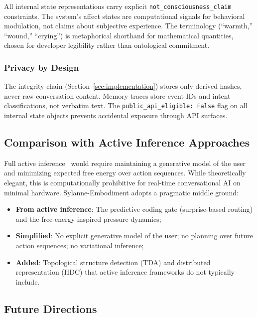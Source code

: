 \documentclass[10pt,twocolumn]{article}
\begin{document}
All internal state representations carry explicit \texttt{not\_consciousness\_claim} constraints. The system's affect states are computational signals for behavioral modulation, not claims about subjective experience. The terminology (``warmth,'' ``wound,'' ``crying'') is metaphorical shorthand for mathematical quantities, chosen for developer legibility rather than ontological commitment.

\subsubsection{Privacy by Design}

The integrity chain (Section~\ref{sec:implementation}) stores only derived hashes, never raw conversation content. Memory traces store event IDs and intent classifications, not verbatim text. The \texttt{public\_api\_eligible: False} flag on all internal state objects prevents accidental exposure through API surfaces.

\subsection{Comparison with Active Inference Approaches}

Full active inference~\cite{parr2022active,smith2022step} would require maintaining a generative model of the user and minimizing expected free energy over action sequences. While theoretically elegant, this is computationally prohibitive for real-time conversational AI on minimal hardware. Sylanne-Embodiment adopts a pragmatic middle ground:

\begin{itemize}[nosep,leftmargin=*]
\item \textbf{From active inference}: The predictive coding gate (surprise-based routing) and the free-energy-inspired pressure dynamics;
\item \textbf{Simplified}: No explicit generative model of the user; no planning over future action sequences; no variational inference;
\item \textbf{Added}: Topological structure detection (TDA) and distributed representation (HDC) that active inference frameworks do not typically include.
\end{itemize}

\subsection{Future Directions}
\end{document}
